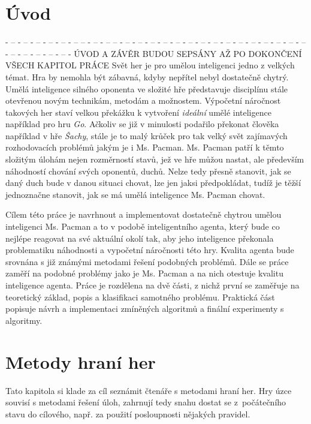 \chapter{Úvod} 
- -- - -- - -- - -- - -- - --  -- - -- - --  -- - -- - -- - -- - -- - -- - -- - -- - -- - -- - -- - -- - -- - -- - -- - -- - -- - -- - -- - -- - -- -
\newline
ÚVOD A ZÁVĚR BUDOU SEPSÁNY AŽ PO DOKONČENÍ VŠECH KAPITOL PRÁCE
\newline
  Svět her je pro umělou inteligenci jedno z velkých témat. Hra by nemohla být zábavná, kdyby nepřítel nebyl dostatečně chytrý. Umělá inteligence silného oponenta ve složité hře představuje disciplínu stále otevřenou novým technikám, metodám a možnostem. Výpočetní náročnost takových her staví velkou překážku k vytvoření \textit{ideální} umělé inteligence například pro hru \textit{Go}. Ačkoliv se již v minulosti podařilo překonat člověka například v hře \textit{Šachy}, stále je to malý krůček pro tak velký svět zajímavých rozhodovacích problémů jakým je i Ms. Pacman. Ms. Pacman patří k těmto složitým úlohám nejen rozměrností stavů, jež ve hře můžou nastat, ale především náhodností chování svých oponentů, duchů. Nelze tedy přesně stanovit, jak se daný duch bude v danou situaci chovat, lze jen jaksi předpokládat, tudíž je těžší jednoznačne stanovit, jak se má umělá inteligence Ms. Pacman chovat.

Cílem této práce je navrhnout a implementovat dostatečně chytrou umělou inteligenci Ms. Pacman a to v podobě inteligentního agenta, který bude co nejlépe reagovat na své aktuální okolí tak, aby jeho inteligence překonala problematiku náhodnosti a vypočetní náročnosti této hry. Kvalita agenta bude srovnána s již známými metodami řešení podobných problémů. Dále se práce zaměří na podobné problémy jako je Ms. Pacman a na nich otestuje kvalitu inteligence agenta. Práce je rozdělena na dvě části, z nichž první se zaměřuje na teoretický základ, popis a klasifikaci samotného problému. Praktická část popisuje návrh a implementaci zmíněných algoritmů a finální experimenty s algoritmy.

\chapter{Metody hraní her}
Tato kapitola si klade za cíl seznámit čtenáře s metodami hraní her. Hry úzce souvisí s metodami řešení úloh, zahrnují tedy snahu dostat se z počátečního stavu do cílového, např. za použití posloupnosti nějakých pravidel. 

